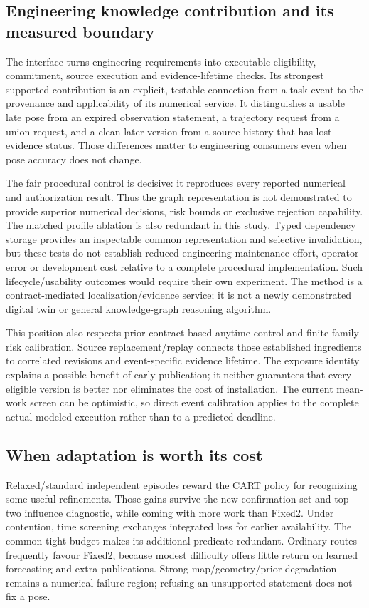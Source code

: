 \subsection{Engineering knowledge contribution and its measured boundary}
The interface turns engineering requirements into executable eligibility, commitment, source execution and evidence-lifetime checks. Its strongest supported contribution is an explicit, testable connection from a task event to the provenance and applicability of its numerical service. It distinguishes a usable late pose from an expired observation statement, a trajectory request from a union request, and a clean later version from a source history that has lost evidence status. Those differences matter to engineering consumers even when pose accuracy does not change.

The fair procedural control is decisive: it reproduces every reported numerical and authorization result. Thus the graph representation is not demonstrated to provide superior numerical decisions, risk bounds or exclusive rejection capability. The matched profile ablation is also redundant in this study. Typed dependency storage provides an inspectable common representation and selective invalidation, but these tests do not establish reduced engineering maintenance effort, operator error or development cost relative to a complete procedural implementation. Such lifecycle/usability outcomes would require their own experiment. The method is a contract-mediated localization/evidence service; it is not a newly demonstrated digital twin or general knowledge-graph reasoning algorithm.

This position also respects prior contract-based anytime control and finite-family risk calibration. Source replacement/replay connects those established ingredients to correlated revisions and event-specific evidence lifetime. The exposure identity explains a possible benefit of early publication; it neither guarantees that every eligible version is better nor eliminates the cost of installation. The current mean-work screen can be optimistic, so direct event calibration applies to the complete actual modeled execution rather than to a predicted deadline.

\subsection{When adaptation is worth its cost}
Relaxed/standard independent episodes reward the CART policy for recognizing some useful refinements. Those gains survive the new confirmation set and top-two influence diagnostic, while coming with more work than Fixed2. Under contention, time screening exchanges integrated loss for earlier availability. The common tight budget makes its additional predicate redundant. Ordinary routes frequently favour Fixed2, because modest difficulty offers little return on learned forecasting and extra publications. Strong map/geometry/prior degradation remains a numerical failure region; refusing an unsupported statement does not fix a pose.

